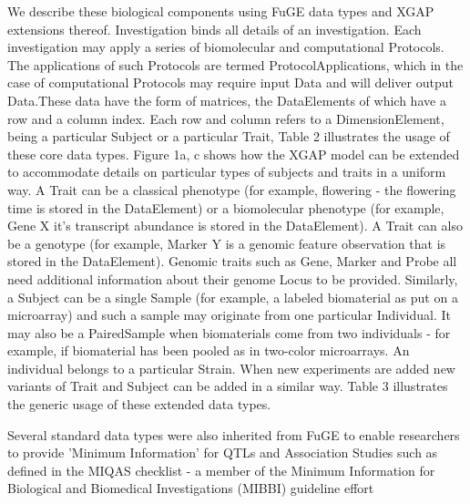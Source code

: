 We describe these biological components using FuGE data types and XGAP extensions thereof. 
Investigation binds all details of an investigation. Each investigation may apply a series 
of biomolecular \cite{Brown:2005} and computational \cite{Carey:2007,Alberts:2008,Fu:2007,Bhave:2007} 
Protocols. The applications of such Protocols are termed ProtocolApplications, which in the case 
of computational Protocols may require 
input Data and will deliver output Data.These data have the form of matrices, the DataElements 
of which have a row and a column index. Each row and column refers to a DimensionElement, 
being a particular Subject or a particular Trait, Table 2 illustrates the usage of these core 
data types. Figure 1a, c shows how the XGAP model can be extended to accommodate details on 
particular types of subjects and traits in a uniform way. A Trait can be a classical phenotype 
(for example, flowering - the flowering time is stored in the DataElement) or a biomolecular 
phenotype (for example, Gene X it's transcript abundance is stored in the DataElement). A 
Trait can also be a genotype (for example, Marker Y is a genomic feature observation that is 
stored in the DataElement). Genomic traits such as Gene, Marker and Probe all need additional 
information about their genome Locus to be provided. Similarly, a Subject can be a single 
Sample (for example, a labeled biomaterial as put on a microarray) and such a sample may 
originate from one particular Individual. It may also be a PairedSample when biomaterials come 
from two individuals - for example, if biomaterial has been pooled as in two-color microarrays. 
An individual belongs to a particular Strain. When new experiments are added new variants of 
Trait and Subject can be added in a similar way. Table 3 illustrates the generic usage of 
these extended data types.

Several standard data types were also inherited from FuGE to enable researchers to provide 
'Minimum Information' for QTLs and Association Studies such as defined in the MIQAS checklist 
 - a member of the Minimum Information for Biological and Biomedical Investigations (MIBBI) 
guideline effort \cite{Taylor:2008}

